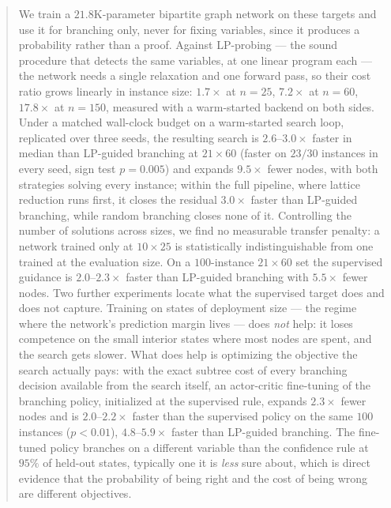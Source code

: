 \documentclass[final,5p,times,twocolumn]{elsarticle}
\begin{document}
\begin{frontmatter}
\begin{abstract}
We train a $21.8$K-parameter bipartite graph network on these targets and use it for branching only, never for fixing variables, since it produces a probability rather than a proof. Against LP-probing --- the sound procedure that detects the same variables, at one linear program each --- the network needs a single relaxation and one forward pass, so their cost ratio grows linearly in instance size: $1.7\times$ at $n=25$, $7.2\times$ at $n=60$, $17.8\times$ at $n=150$, measured with a warm-started backend on both sides. Under a matched wall-clock budget on a warm-started search loop, replicated over three seeds, the resulting search is $2.6$--$3.0\times$ faster in median than LP-guided branching at $21\times60$ (faster on $23/30$ instances in every seed, sign test $p=0.005$) and expands $9.5\times$ fewer nodes, with both strategies solving every instance; within the full pipeline, where lattice reduction runs first, it closes the residual $3.0\times$ faster than LP-guided branching, while random branching closes none of it. Controlling the number of solutions across sizes, we find no measurable transfer penalty: a network trained only at $10\times25$ is statistically indistinguishable from one trained at the evaluation size. On a $100$-instance $21\times60$ set the supervised guidance is $2.0$--$2.3\times$ faster than LP-guided branching with $5.5\times$ fewer nodes. Two further experiments locate what the supervised target does and does not capture. Training on states of deployment size --- the regime where the network's prediction margin lives --- does \emph{not} help: it loses competence on the small interior states where most nodes are spent, and the search gets slower. What does help is optimizing the objective the search actually pays: with the exact subtree cost of every branching decision available from the search itself, an actor-critic fine-tuning of the branching policy, initialized at the supervised rule, expands $2.3\times$ fewer nodes and is $2.0$--$2.2\times$ faster than the supervised policy on the same $100$ instances ($p<0.01$), $4.8$--$5.9\times$ faster than LP-guided branching. The fine-tuned policy branches on a different variable than the confidence rule at $95\%$ of held-out states, typically one it is \emph{less} sure about, which is direct evidence that the probability of being right and the cost of being wrong are different objectives.


\end{abstract}
\end{frontmatter}
\end{document}
